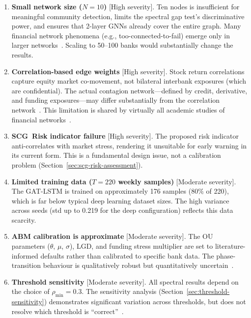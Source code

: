 \begin{enumerate}
    \item \textbf{Small network size ($N=10$)} [High severity]. Ten nodes is insufficient for meaningful community detection, limits the spectral gap test's discriminative power, and ensures that 2-layer GNNs already cover the entire graph. Many financial network phenomena (e.g., too-connected-to-fail) emerge only in larger networks~\cite{haldane2011systemic,acemoglu2015systemic}. Scaling to 50--100 banks would substantially change the results.

    \item \textbf{Correlation-based edge weights} [High severity]. Stock return correlations capture equity market co-movement, not bilateral interbank exposures (which are confidential). The actual contagion network---defined by credit, derivative, and funding exposures---may differ substantially from the correlation network~\cite{caccioli2018network,soramaki2007topology}. This limitation is shared by virtually all academic studies of financial networks~\cite{mantegna1999introduction,bonanno2004networks}.

    \item \textbf{SCG~Risk indicator failure} [High severity]. The proposed risk indicator anti-correlates with market stress, rendering it unsuitable for early warning in its current form. This is a fundamental design issue, not a calibration problem (Section~\ref{sec:scg-risk-assessment}).

    \item \textbf{Limited training data ($T=220$ weekly samples)} [Moderate severity]. The GAT-LSTM is trained on approximately 176 samples (80\% of 220), which is far below typical deep learning dataset sizes. The high variance across seeds (std up to 0.219 for the deep configuration) reflects this data scarcity.

    \item \textbf{ABM calibration is approximate} [Moderate severity]. The OU parameters ($\theta$, $\mu$, $\sigma$), LGD, and funding stress multiplier are set to literature-informed defaults rather than calibrated to specific bank data. The phase-transition behaviour is qualitatively robust but quantitatively uncertain~\cite{nier2007network}.

    \item \textbf{Threshold sensitivity} [Moderate severity]. All spectral results depend on the choice of $\rho_{\min} = 0.3$. The sensitivity analysis (Section~\ref{sec:threshold-sensitivity}) demonstrates significant variation across thresholds, but does not resolve which threshold is ``correct''~\cite{tumminello2007correlation}.


\end{enumerate}
